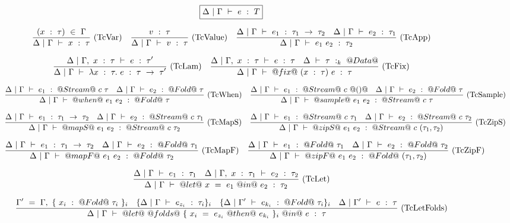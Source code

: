 \begin{figure*}

$$
\boxed{\Delta~|~\Gamma ~\vdash~ e~:~T}
$$


$$
\enskip \frac {\displaystyle 
    (x~:~\tau)~\in~\Gamma
} {\displaystyle  
    \Delta~|~\Gamma ~\vdash~ x~:~\tau
} \  \mbox{(TcVar)} \enskip
\enskip \frac {\displaystyle 
    v~:~\tau
} {\displaystyle  
    \Delta~|~\Gamma ~\vdash~ v~:~\tau
} \  \mbox{(TcValue)} \enskip
\enskip \frac {\displaystyle 
    \Delta~|~\Gamma ~\vdash~ e_1~:~\tau_1~\to~\tau_2
    \quad
    \Delta~|~\Gamma ~\vdash~ e_2~:~\tau_1
} {\displaystyle  
    \Delta~|~\Gamma ~\vdash~ e_1~e_2~:~\tau_2
} \  \mbox{(TcApp)} \enskip
$$

$$
\enskip \frac {\displaystyle 
    \Delta~|~\Gamma,~x~:~\tau ~\vdash~ e~:~\tau'
} {\displaystyle 
    \Delta~|~\Gamma ~\vdash~ \lambda{}x~:~\tau.~e~:~\tau~\to~\tau'
} \  \mbox{(TcLam)} \enskip
\enskip \frac {\displaystyle 
    \Delta~|~\Gamma,~x~:~\tau ~\vdash~ e~:~\tau
    \quad
    \Delta~\vdash~\tau~:_k~@Data@
} {\displaystyle 
    \Delta~|~\Gamma ~\vdash~ @fix@~(x~:~\tau)~e~:~\tau
} \  \mbox{(TcFix)} \enskip
$$

$$
\enskip \frac {\displaystyle 
    \Delta~|~\Gamma ~\vdash~ e_1~:~@Stream@~c~\tau
    \quad
    \Delta~|~\Gamma ~\vdash~ e_2~:~@Fold@~\tau
} {\displaystyle 
    \Delta~|~\Gamma ~\vdash~ @when@~e_1~e_2~:~@Fold@~\tau
} \  \mbox{(TcWhen)} \enskip
\enskip \frac {\displaystyle 
    \Delta~|~\Gamma ~\vdash~ e_1~:~@Stream@~c~@()@
    \quad
    \Delta~|~\Gamma ~\vdash~ e_2~:~@Fold@~\tau
} {\displaystyle 
    \Delta~|~\Gamma ~\vdash~ @sample@~e_1~e_2~:~@Stream@~c~\tau
} \  \mbox{(TcSample)} \enskip
$$

$$
\enskip \frac {\displaystyle 
    \Delta~|~\Gamma ~\vdash~ e_1~:~\tau_1~\to~\tau_2
    \quad
    \Delta~|~\Gamma ~\vdash~ e_2~:~@Stream@~c~\tau_1
} {\displaystyle 
    \Delta~|~\Gamma ~\vdash~ @mapS@~e_1~e_2~:~@Stream@~c~\tau_2
} \  \mbox{(TcMapS)} \enskip
\enskip \frac {\displaystyle 
    \Delta~|~\Gamma ~\vdash~ e_1~:~@Stream@~c~\tau_1
    \quad
    \Delta~|~\Gamma ~\vdash~ e_2~:~@Stream@~c~\tau_2
} {\displaystyle 
    \Delta~|~\Gamma ~\vdash~ @zipS@~e_1~e_2~:~@Stream@~c~(\tau_1,\tau_2)
} \  \mbox{(TcZipS)} \enskip
$$

$$
\enskip \frac {\displaystyle 
    \Delta~|~\Gamma ~\vdash~ e_1~:~\tau_1~\to~\tau_2
    \quad
    \Delta~|~\Gamma ~\vdash~ e_2~:~@Fold@~\tau_1
} {\displaystyle 
    \Delta~|~\Gamma ~\vdash~ @mapF@~e_1~e_2~:~@Fold@~\tau_2
} \  \mbox{(TcMapF)} \enskip
\enskip \frac {\displaystyle 
    \Delta~|~\Gamma ~\vdash~ e_1~:~@Fold@~\tau_1
    \quad
    \Delta~|~\Gamma ~\vdash~ e_2~:~@Fold@~\tau_2
} {\displaystyle 
    \Delta~|~\Gamma ~\vdash~ @zipF@~e_1~e_2~:~@Fold@~(\tau_1,\tau_2)
} \  \mbox{(TcZipF)} \enskip
$$

$$
\enskip \frac {\displaystyle 
    \Delta~|~\Gamma ~\vdash~ e_1~:~\tau_1
    \quad
    \Delta~|~\Gamma,~x~:~\tau_1 ~\vdash~ e_2~:~\tau_2
} {\displaystyle 
    \Delta~|~\Gamma ~\vdash~ @let@~x~=~e_1~@in@~e_2~:~\tau_2
} \  \mbox{(TcLet)} \enskip
$$

$$
\enskip \frac {\displaystyle 
    \Gamma'~=~\Gamma,~\{~x_i~:~@Fold@~\tau_i~\}_i
    \quad
    \{
    \Delta~|~\Gamma ~\vdash~ e_{z_i}~:~\tau_i
    \}_i
    \quad
    \{
    \Delta~|~\Gamma' ~\vdash~ e_{k_i}~:~@Fold@~\tau_i
    \}_i
    \quad
    \Delta~|~\Gamma' ~\vdash~ e~:~\tau
} {\displaystyle 
    \Delta~|~\Gamma ~\vdash~ @let@~@folds@~\{~x_i~=~e_{z_i}~@then@~e_{k_i}~\}_i~@in@~e~:~\tau
} \  \mbox{(TcLetFolds)} \enskip
$$


\end{figure*}
